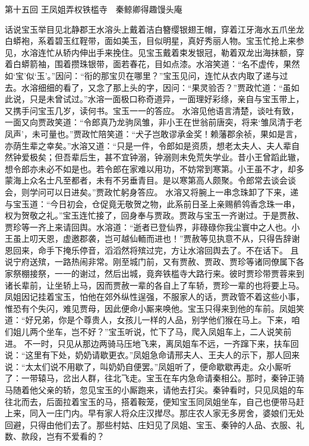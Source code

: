 \documentclass[12pt,oneside]{book}
\begin{document}
 
第十五回  王凤姐弄权铁槛寺　秦鲸卿得趣馒头庵


话说宝玉举目见北静郡王水溶头上戴着洁白簪缨银翅王帽，穿着江牙海水五爪坐龙白蟒袍，系着碧玉红鞓带，面如美玉，目似明星，真好秀丽人物。宝玉忙抢上来参见，水溶连忙从轿内伸出手来挽住。见宝玉戴着束发银冠，勒着双龙出海抹额，穿着白蟒箭袖，围着攒珠银带，面若春花，目如点漆。水溶笑道：“名不虚传，果然如‘宝’似‘玉’。”因问：“衔的那宝贝在哪里？”宝玉见问，连忙从衣内取了递与过去。水溶细细的看了，又念了那上头的字，因问：“果灵验否？”贾政忙道：“虽如此说，只是未曾试过。”水溶一面极口称奇道异，一面理好彩绦，亲自与宝玉带上，又携手问宝玉几岁，读何书。宝玉一一的答应。
水溶见他语言清楚，谈吐有致，一面又向贾政笑道：“令郎真乃龙驹凤雏，非小王在世翁前唐突，将来‘雏凤清于老凤声’，未可量也。”贾政忙陪笑道：“犬子岂敢谬承金奖！赖藩郡余祯，果如是言，亦荫生辈之幸矣。”水溶又道：“只是一件，令郎如是资质，想老太夫人、夫人辈自然钟爱极矣；但吾辈后生，甚不宜钟溺，钟溺则未免荒失学业。昔小王曾蹈此辙，想令郎亦未必不如是也。若令郎在家难以用功，不妨常到寒第。小王虽不才，却多蒙海上众名士凡至都者，未有不另垂青目。是以寒第高人颇聚。令郎常去谈会谈会，则学问可以日进矣。”贾政忙躬身答应。
水溶又将腕上一串念珠卸了下来，递与宝玉道：“今日初会，仓促竟无敬贺之物，此系前日圣上亲赐鹡鸰香念珠一串，权为贺敬之礼。”宝玉连忙接了，回身奉与贾政。贾政与宝玉一齐谢过。于是贾赦、贾珍等一齐上来请回舆。水溶道：“逝者已登仙界，非碌碌你我尘寰中之人也。小王虽上叨天恩，虚邀郡袭，岂可越仙輀而进也！”贾赦等见执意不从，只得告辞谢恩回来，命手下掩乐停音，滔滔然将殡过完，方让水溶回舆去了。不在话下。
且说宁府送殡，一路热闹非常。刚至城门前，又有贾赦、贾政、贾珍等诸同僚属下各家祭棚接祭，一一的谢过，然后出城，竟奔铁槛寺大路行来。彼时贾珍带贾蓉来到诸长辈前，让坐轿上马，因而贾赦一辈的各自上了车轿，贾珍一辈的也将要上马。凤姐因记挂着宝玉，怕他在郊外纵性逞强，不服家人的话，贾政管不着这些小事，惟恐有个失闪，难见贾母，因此便命小厮来唤他。宝玉只得来到他的车前。凤姐笑道：“好兄弟，你是个尊贵人，女孩儿一样的人品，别学他们猴在马上。下来，咱们姐儿两个坐车，岂不好？”宝玉听说，忙下了马，爬入凤姐车上，二人说笑前进。
不一时，只见从那边两骑马压地飞来，离凤姐车不远，一齐蹿下来，扶车回说：“这里有下处，奶奶请歇更衣。”凤姐急命请邢夫人、王夫人的示下，那人回来说：“太太们说不用歇了，叫奶奶自便罢。”凤姐听了，便命歇歇再走。众小厮听了：一带辕马，岔出人群，往北飞走。宝玉在车内急命请秦相公。那时，秦钟正骑马随着他父亲的轿，忽见宝玉的小厮跑来，请他去打尖。秦钟看时，只见凤姐的车往北而去，后面拉着宝玉的马，搭着鞍笼，便知宝玉同凤姐坐车，自己也便带马赶上来，同入一庄门内。早有家人将众庄汉撵尽。那庄农人家无多房舍，婆娘们无处回避，只得由他们去了。那些村姑、庄妇见了凤姐、宝玉、秦钟的人品、衣服、礼数、款段，岂有不爱看的？
\end{document}
